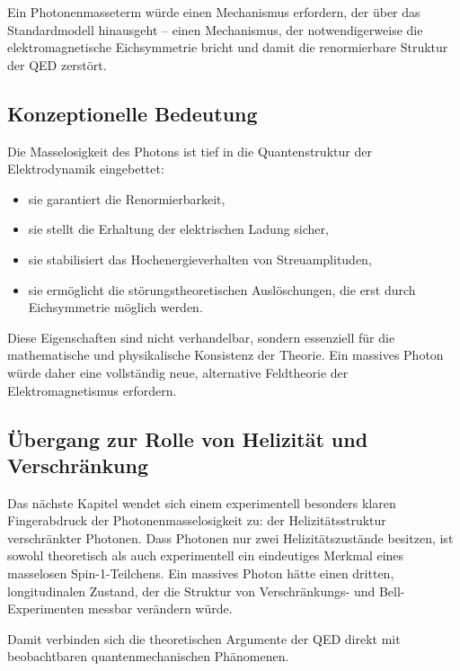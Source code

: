 Ein Photonenmasseterm würde einen Mechanismus erfordern, der über das 
Standardmodell hinausgeht – einen Mechanismus, der notwendigerweise die 
elektromagnetische Eichsymmetrie bricht und damit die renormierbare Struktur 
der QED zerstört.

\subsection*{Konzeptionelle Bedeutung}

Die Masselosigkeit des Photons ist tief in die Quantenstruktur der 
Elektrodynamik eingebettet:

\begin{itemize}
	\item sie garantiert die Renormierbarkeit,
	\item sie stellt die Erhaltung der elektrischen Ladung sicher,
	\item sie stabilisiert das Hochenergieverhalten von Streuamplituden,
	\item sie ermöglicht die störungstheoretischen Auslöschungen, die erst 
	durch Eichsymmetrie möglich werden.
\end{itemize}

Diese Eigenschaften sind nicht verhandelbar, sondern essenziell für die 
mathematische und physikalische Konsistenz der Theorie. Ein massives Photon 
würde daher eine vollständig neue, alternative Feldtheorie der 
Elektromagnetismus erfordern.

\subsection*{Übergang zur Rolle von Helizität und Verschränkung}

Das nächste Kapitel wendet sich einem experimentell besonders klaren Fingerabdruck 
der Photonenmasselosigkeit zu: der Helizitätsstruktur verschränkter Photonen.  
Dass Photonen nur zwei Helizitätszustände besitzen, ist sowohl theoretisch als 
auch experimentell ein eindeutiges Merkmal eines masselosen Spin-1-Teilchens.  
Ein massives Photon hätte einen dritten, longitudinalen Zustand, der die 
Struktur von Verschränkungs- und Bell-Experimenten messbar verändern würde.

Damit verbinden sich die theoretischen Argumente der QED direkt mit 
beobachtbaren quantenmechanischen Phänomenen.
